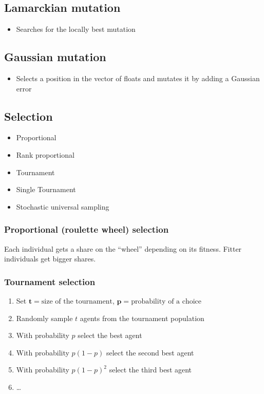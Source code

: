\documentclass{article}
\begin{document}
    \subsection{Lamarckian mutation}
    \begin{itemize}
        \item Searches for the locally best mutation
    \end{itemize}

    \subsection{Gaussian mutation}
    \begin{itemize}
        \item Selects a position in the vector of floats and mutates it by adding a Gaussian error
    \end{itemize}

    \subsection{Selection}
    \begin{itemize}
        \item Proportional
        \item Rank proportional
        \item Tournament
        \item Single Tournament
        \item Stochastic universal sampling
    \end{itemize}

        \subsubsection{Proportional (roulette wheel) selection}
        Each individual gets a share on the ``wheel'' depending on its fitness. Fitter individuals get bigger shares. 

        \subsubsection{Tournament selection}
        \begin{enumerate}
            \item Set 
                $\mathbf{t} = \text{size of the tournament}$,
                $\mathbf{p} = \text{probability of a choice}$
            \item Randomly sample $t$ agents from the tournament population
            \item With probability $p$ select the best agent
            \item With probability $p(1 - p)$ select the second best agent
            \item With probability $p{(1-p)}^2$ select the third best agent
            \item \ldots
        \end{enumerate}
\end{document}
